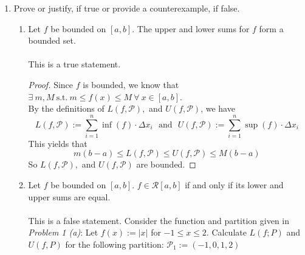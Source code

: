 \documentclass[12pt,letterpaper]{article}
\newcommand{\st}{\ \text{s.t.}\ }
\newcommand{\R}{\mathbb{R}}
\newcommand{\Q}{\mathbb{Q}}
\theoremstyle{case}
\theoremstyle{definition}
\begin{document}
\begin{enumerate}
\begin{enumerate}
\begin{proof}
			\end{proof}
			\item Find examples of bounded functions $f,g:[a,b] \to \R$ such that $U(f+g,\mathcal{P}) < U(f, \mathcal{P}) + U(g,\mathcal{P})$ for some partition of $[a,b]$.
			\\\\Consider the functions $f,g:[a,b] \to \R$ given by $f(x):=\begin{cases}
			1, &x \in \R\setminus\Q \\
			0, &x \in \Q
			\end{cases}$  and  $g(x):=\begin{cases}
			-1, &x \in \R\setminus\Q \\
			0, &x \in \Q
			\end{cases}$
			\\Thus, we have that $(f+g)(x) = 0\ \forall\  x$, and thus $U(f+g)=0$. However, we note that $U(f,\mathcal{P})+U(g,\mathcal{P})=1+0 = 1$. Thus, $0=U(f+g,\mathcal{P})<U(f,\mathcal{P})+U(g,\mathcal{P})=1$.
		\end{enumerate}
		\item Prove or justify, if true or provide a counterexample, if false.
		\begin{enumerate}
			\item Let $f$ be bounded on $[a,b]$. The upper and lower sums for $f$ form a bounded set.
			\\\\This is a true statement.
			\begin{proof}
				Since $f$ is bounded, we know that $\exists\ m,M \st m \leq f(x) \leq M\ \forall\ x \in [a,b]$.\\
				By the definitions of $L(f,\mathcal{P}),$ and $U(f,\mathcal{P})$, we have
				\[L(f,\mathcal{P}):= \sum_{i=1}^n\inf (f)\cdot\Delta x_i\ \ \ \text{and}\ \ \ U(f,\mathcal{P}):= \sum_{i=1}^{n} \sup (f)\cdot\Delta x_i\]
				This yields that 
				\[m(b-a)\leq L(f,\mathcal{P})\leq U(f,\mathcal{P})\leq M(b-a)\]
				So $L(f,\mathcal{P}),$ and $U(f,\mathcal{P})$ are bounded.
			\end{proof}
			\item Let $f$ be bounded on $[a,b]$. $f \in \mathcal{R}[a,b]$ if and only if its lower and upper sums are equal.
			\\\\This is a false statement. Consider the function and partition given in \textit{Problem 1 (a)}:
			Let $f(x):=|x|$ for $-1 \leq x \leq 2$. Calculate $L(f;P)$ and $U(f,P)$ for the following partition: $\mathcal{P}_1 :=(-1,0,1,2)$

\end{enumerate}
\end{enumerate}
\end{document}
